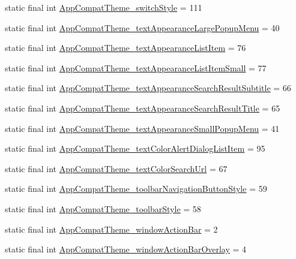 \begin{DoxyCompactItemize}
\item 
static final int \hyperlink{classproject4_1_1xaria_1_1R_1_1styleable_a33d0593c2cd3f80d60995b4580bed2db}{App\+Compat\+Theme\+\_\+switch\+Style} = 111
\item 
static final int \hyperlink{classproject4_1_1xaria_1_1R_1_1styleable_a0f3ef906935af92b8a0555a151cdb0a4}{App\+Compat\+Theme\+\_\+text\+Appearance\+Large\+Popup\+Menu} = 40
\item 
static final int \hyperlink{classproject4_1_1xaria_1_1R_1_1styleable_aa6c67f0600a5d8caedaf5e80e8a4acb7}{App\+Compat\+Theme\+\_\+text\+Appearance\+List\+Item} = 76
\item 
static final int \hyperlink{classproject4_1_1xaria_1_1R_1_1styleable_adc238aae83f2e253317ab04cf7aa7ef5}{App\+Compat\+Theme\+\_\+text\+Appearance\+List\+Item\+Small} = 77
\item 
static final int \hyperlink{classproject4_1_1xaria_1_1R_1_1styleable_ac77446b89989c34ed15642f5e5860c71}{App\+Compat\+Theme\+\_\+text\+Appearance\+Search\+Result\+Subtitle} = 66
\item 
static final int \hyperlink{classproject4_1_1xaria_1_1R_1_1styleable_a489601ae9406c0857de192f2c579d01f}{App\+Compat\+Theme\+\_\+text\+Appearance\+Search\+Result\+Title} = 65
\item 
static final int \hyperlink{classproject4_1_1xaria_1_1R_1_1styleable_a0b2edd58e797e1a0b12ec98975f7b355}{App\+Compat\+Theme\+\_\+text\+Appearance\+Small\+Popup\+Menu} = 41
\item 
static final int \hyperlink{classproject4_1_1xaria_1_1R_1_1styleable_aea2ca8637844e7e15e92fc8a9341e92d}{App\+Compat\+Theme\+\_\+text\+Color\+Alert\+Dialog\+List\+Item} = 95
\item 
static final int \hyperlink{classproject4_1_1xaria_1_1R_1_1styleable_aabbc8b91c6cabb8ea2973b309f65c63c}{App\+Compat\+Theme\+\_\+text\+Color\+Search\+Url} = 67
\item 
static final int \hyperlink{classproject4_1_1xaria_1_1R_1_1styleable_ae547053c95c192e4f25178aa4530ee6a}{App\+Compat\+Theme\+\_\+toolbar\+Navigation\+Button\+Style} = 59
\item 
static final int \hyperlink{classproject4_1_1xaria_1_1R_1_1styleable_a77e2df5acbe372a663d1ccbcf26269ee}{App\+Compat\+Theme\+\_\+toolbar\+Style} = 58
\item 
static final int \hyperlink{classproject4_1_1xaria_1_1R_1_1styleable_a63da97bf5664857a9e2d0b8f5ba65d80}{App\+Compat\+Theme\+\_\+window\+Action\+Bar} = 2
\item 
static final int \hyperlink{classproject4_1_1xaria_1_1R_1_1styleable_a06afb482b15287963396e764ae69b472}{App\+Compat\+Theme\+\_\+window\+Action\+Bar\+Overlay} = 4

\end{DoxyCompactItemize}
